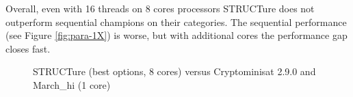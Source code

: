 Overall, even with 16 threads on 8 cores processors STRUCTure
does not outperform sequential champions on their categories.
The sequential performance (see Figure \ref{fig:para-1X}) is worse,
but with additional cores the performance gap closes fast.


\begin{figure}
  \centering
  \caption{STRUCTure (best options, 8 cores) versus Cryptominisat
  2.9.0 and March\_hi (1 core)}
  \label{fig:compare}
\end{figure}
